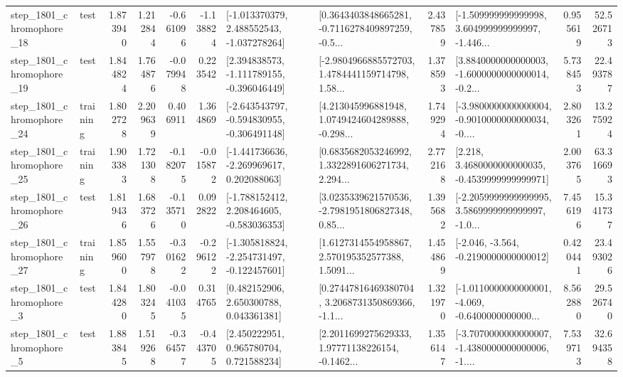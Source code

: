 \begin{tabular}{llrrrrllrlrr}
 step\_1801\_chromophore\_18 &      test &      1.873940 &    1.212844 &     -0.661096 & -1.138824 &   [-1.013370379, 2.488552543, -1.037278264] &  [0.3643403848665281, -0.7116278409897259, -0.5... &       2.437859 &  [-1.509999999999998, 3.604999999999997, -1.446... &            0.955619 &         52.526713 \\
 step\_1801\_chromophore\_19 &      test &      1.844824 &    1.764876 &     -0.079948 &  0.223542 &   [2.394838573, -1.111789155, -0.396046449] &  [-2.9804966885572703, 1.4784441159714798, 1.58... &       1.378593 &  [3.8840000000000003, -1.6000000000000014, -0.2... &            5.738453 &         22.493787 \\
 step\_1801\_chromophore\_24 &  training &      1.802728 &    2.209639 &      0.406911 &  1.364869 &  [-2.643543797, -0.594830955, -0.306491148] &  [4.213045996881948, 1.0749424604289888, -0.298... &       1.749294 &  [-3.9800000000000004, -0.9010000000000034, -0.... &            2.803261 &         13.275924 \\
 step\_1801\_chromophore\_25 &  training &      1.903383 &    1.721308 &     -0.182075 & -0.015872 &   [-1.441736636, -2.269969617, 0.202088063] &  [0.6835682053246992, 1.3322891606271734, 2.294... &       2.772168 &   [2.218, 3.4680000000000035, -0.4539999999999971] &            2.003765 &         63.316693 \\
 step\_1801\_chromophore\_26 &      test &      1.819436 &    1.683726 &     -0.135710 &  0.092822 &   [-1.788152412, 2.208464605, -0.583036353] &  [3.0235339621570536, -2.7981951806827348, 0.85... &       1.395682 &  [-2.2059999999999995, 3.5869999999999997, -1.0... &            7.456196 &         15.341737 \\
 step\_1801\_chromophore\_27 &  training &      1.859600 &    1.557978 &     -0.301622 & -0.296122 &  [-1.305818824, -2.254731497, -0.122457601] &  [1.6127314554958867, 2.570195352577388, 1.5091... &       1.454869 &              [-2.046, -3.564, -0.2190000000000012] &            0.420441 &         23.493026 \\
  step\_1801\_chromophore\_3 &      test &      1.844280 &    1.803245 &     -0.041035 &  0.314765 &     [0.482152906, 2.650300788, 0.043361381] &  [0.27447816469380704, 3.2068731350869366, -1.1... &       1.321970 &  [-1.0110000000000001, -4.069, -0.6400000000000... &            8.562880 &         29.526740 \\
  step\_1801\_chromophore\_5 &      test &      1.883845 &    1.519268 &     -0.364577 & -0.443705 &     [2.450222951, 0.965780704, 0.721588234] &  [2.2011699275629333, 1.97771138226154, -0.1462... &       1.356147 &  [-3.7070000000000007, -1.4380000000000006, -1.... &            7.539713 &         32.694358 \\

\end{tabular}
